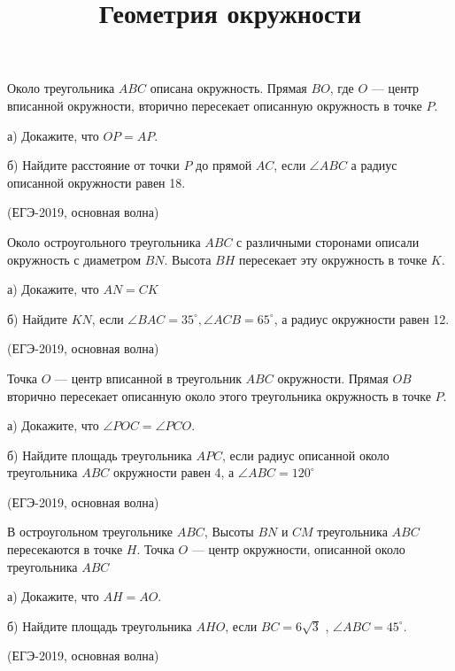 \documentclass[c,12pt]{beamer}  %
\begin{document}
\title{Геометрия окружности}
\frame[plain]{\titlepage}	%

	\begin{frame}
		\begin{block}{}
			Около треугольника $ ABC $ описана окружность. Прямая $ BO $, где $ O $ — центр вписанной окружности, вторично пересекает описанную окружность в точке $ P $.
			
			а) Докажите, что $ OP=AP $.
			
			б) Найдите расстояние от точки $ P $ до прямой $ AC $, если $ \angle ABC $ а радиус описанной окружности равен 18.
			
			(ЕГЭ-2019, основная волна)
		\end{block}
	\end{frame}

	\begin{frame}
		\begin{block}{}
			Около остроугольного треугольника $ ABC $ с различными сторонами описали окружность с диаметром $ BN $. Высота $ BH $ пересекает эту окружность в точке $ K $.
			
			а) Докажите, что $ AN=CK $
			
			б) Найдите $ KN $, если $ \angle BAC=35^\circ, \angle ACB=65^\circ $, а радиус окружности равен 12.
			
			(ЕГЭ-2019, основная волна)
		\end{block}
	\end{frame}
	\begin{frame}
		\begin{block}{}
			Точка $ O $ — центр вписанной в треугольник $ ABC $ окружности. Прямая $ OB $ вторично пересекает описанную около этого треугольника окружность в точке $ P $.
			
			а) Докажите, что $ \angle POC=\angle PCO $.
			
			б) Найдите площадь треугольника $ APC $, если радиус описанной около треугольника $ ABC $ окружности равен 4, а $ \angle ABC=120^\circ $
			
			(ЕГЭ-2019, основная волна)
		\end{block}
	\end{frame}

	\begin{frame}
		\begin{block}{}
			В остроугольном треугольнике $ ABC $, Высоты $ BN $ и $ CM $ треугольника $ ABC $ пересекаются в точке $ H $. Точка $ O $ — центр окружности, описанной около треугольника $ ABC $
			
			а) Докажите, что $ AH=AO $.
			
			б) Найдите площадь треугольника $ AHO $, если $ BC=6\sqrt{3}$ , $ \angle ABC=45^\circ $.
			
			(ЕГЭ-2019, основная волна)
		\end{block}
	\end{frame}
	
\end{document}
